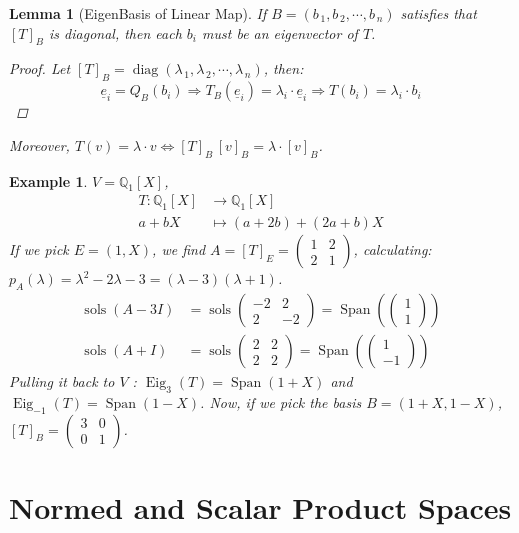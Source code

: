 \documentclass[12pt]{article}
\let\RA\Rightarrow
\let\LR\Leftrightarrow
\newcommand{\tuple}[1]{\underline{#1}}
\newcommand{\seq}[2]{\left({#1}_{\,1},{#1}_{\,2},\cdots,{#1}_{\,#2}\right)}
\DeclareMathOperator{\Span}{Span}
\DeclareMathOperator{\sols}{sols}
\DeclareMathOperator{\Eig}{Eig}
\DeclareMathOperator{\diag}{diag}
\newtheorem{lemma}{Lemma}[subsection]
\newtheorem{example}{Example}[subsection]
\begin{document}
\begin{lemma}[EigenBasis of Linear Map]
  If $B=\seq{b}{n}$ satisfies that $[T]_B$ is diagonal, then each $b_i$ must be an eigenvector of $T$.
  \begin{proof}
    Let $[T]_B=\diag\seq{\lambda}{n}$, then: $$\tuple{e}_i=Q_B(b_i)\RA T_B(\tuple{e}_i)=\lambda_i\cdot \tuple{e}_i\RA T(b_i)=\lambda_i\cdot b_i$$
  \end{proof}
  Moreover, $T(v)=\lambda\cdot v\LR [T]_B\,[v]_B=\lambda\cdot [v]_B$.
\end{lemma}

\begin{example}
  $V=\mathbb{Q}_1[X]$,
  \begin{align*}
    T:\mathbb{Q}_1[X]&\to\mathbb{Q}_1[X]\\
    a+bX&\mapsto (a+2b)+(2a+b)X
  \end{align*}
  If we pick $E=(1,X)$, we find $A=[T]_E=\begin{pmatrix}1&2\\2&1\end{pmatrix}$, calculating: $p_A(\lambda)=\lambda^2-2\lambda-3=(\lambda-3)(\lambda+1)$.
  \begin{align*}
    \sols(A-3I)&=\sols\begin{pmatrix}-2&2\\2&-2\end{pmatrix}=\Span\left(\begin{pmatrix}1\\1\end{pmatrix}\right) \\
    \sols(A+I)&=\sols\begin{pmatrix}2&2\\2&2\end{pmatrix}=\Span\left(\begin{pmatrix}1\\-1\end{pmatrix}\right)
  \end{align*}
  Pulling it back to $V$ : $\Eig_3(T)=\Span(1+X)$ and $\Eig_{-1}(T)=\Span(1-X)$. Now, if we pick the basis $B=(1+X,1-X)$, $[T]_B=\begin{pmatrix}3&0\\0&1\end{pmatrix}$.
\end{example}

\pagebreak

\section{Normed and Scalar Product Spaces}
\end{document}
